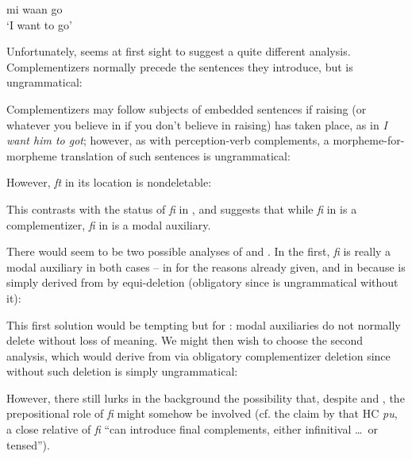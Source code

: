 \ea\label{ex:2:190}
 mi waan go \\
\glt `I want to go'
\z

Unfortunately,  seems at first sight to suggest a quite different analysis. Complementizers normally precede the sentences they introduce, but  is ungrammatical:

\z

Complementizers may follow subjects of embedded sentences if raising (or whatever you believe in if you don't believe in raising) has taken place, as in \textit{I want him to got}; however, as with perception-verb complements, a morpheme-for-morpheme translation of such sentences is ungrammatical:

\glt
\z

However, \textit{ft} in its  location is nondeletable:

\z
This contrasts with the status of \textit{fi} in , and suggests that while
\textit{fi} in  is a complementizer, \textit{fi} in  is a modal auxiliary.

There would seem to be two possible analyses of  and . In the first, \textit{fi} is really a modal auxiliary in both cases -- in  for the reasons already given, and in  because  is simply derived from  by equi-deletion (obligatory since  is ungrammatical without it):

\z

This first solution would be tempting but for : modal auxiliaries do not normally delete without loss of meaning. We might then wish to choose the second analysis, which would derive  from  via obligatory complementizer deletion since without such deletion  is simply ungrammatical:

\z

However, there still lurks in the background the possibility that, despite  and , the prepositional role of \textit{fi} might somehow be involved (cf. the claim by \citet{KoopmanEtAl1981} that HC \textit{pu}, a close relative of \textit{fi} ``can introduce final complements, either infinitival \ldots~or tensed'').

